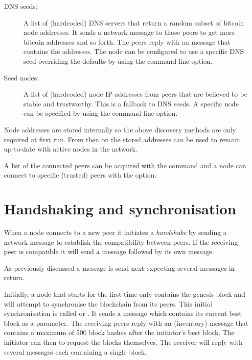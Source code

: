 \begin{description}
\item[DNS seeds:] A list of (hardcoded) DNS servers that return a random subset of bitcoin node addresses. It sends a  network message to those peers to get more bitcoin addresses and so forth. The peers reply with an  message that contains the addresses. The node can be configured to use a specific DNS seed overriding the defaults by using the  command-line option.
\item[Seed nodes:] A list of (hardcoded) node IP addresses from peers that are believed to be stable and trustworthy. This is a fallback to DNS seeds. A specific node can be specified by using the  command-line option.
\end{description}

Node addresses are stored internally so the above discovery methods are only required at first run. From then on the stored addresses can be used to remain up-to-date with active nodes in the network.

A list of the connected peers can be acquired with the  command and a node can connect to specific (trusted) peers with the  option.


\section{Handshaking and synchronisation}
When a node connects to a new peer it initiates a \emph{handshake} by sending a  network message to establish the compatibility between peers. If the receiving peer is compatible it will send a  message followed by its own  message.

As previously discussed a  message is send next expecting several  messages in return.

Initially, a node that starts for the first time only contains the genesis block and will attempt to synchronise the blockchain from its peers. This initial synchronisation is called  or . It sends a  message which contains its current best block as a parameter. The receiving peers reply with an  (inventory) message that contains a maximum of 500 block hashes after the initiator’s best block. The initiator can then  to request the blocks themselves. The receiver will reply with several  messages each containing a single block.


